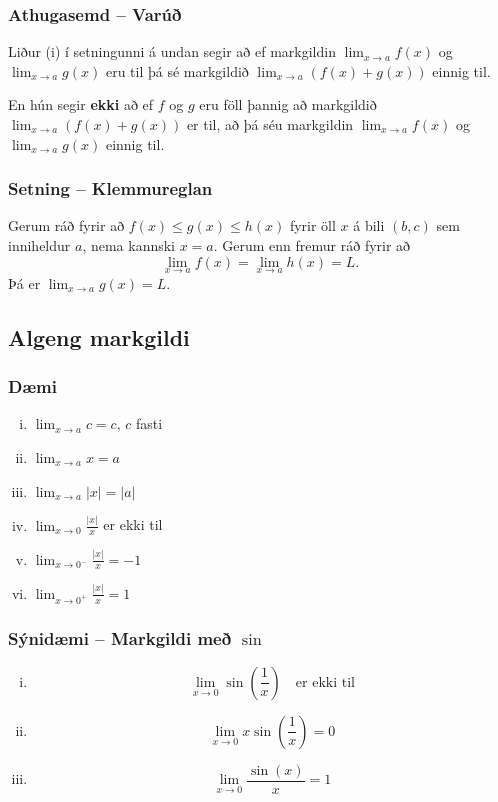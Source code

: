 \documentclass[icelandic,a4paper,12pt]{article}
\begin{document}
\subsubsection{Athugasemd -- Varúð}
Liður (i) í setningunni á undan segir að ef markgildin
$\lim_{x\to a} f(x)$ og $\lim_{x\to a} g(x)$ eru til þá
sé markgildið $\lim_{x\to a} (f(x)+g(x))$ einnig til.

\pause
En hún segir {\bf ekki} að ef 
$f$ og $g$ eru föll þannig að markgildið
$\lim_{x\to a} (f(x)+g(x))$ er til, að þá séu markgildin
$\lim_{x\to a} f(x)$ og $\lim_{x\to a} g(x)$ einnig til.

\subsubsection{Setning -- Klemmureglan}Gerum ráð fyrir að $f(x)\leq
g(x)\leq h(x)$ fyrir öll $x$ á bili $(b, c)$ sem
inniheldur $a$, nema kannski $x=a$.  Gerum enn fremur ráð fyrir að 
$$\lim_{x\rightarrow a}f(x)=\lim_{x\rightarrow a}h(x)=L.$$
Þá er $\lim_{x\rightarrow a}g(x)=L$.


\subsection{Algeng markgildi}
\subsubsection{Dæmi}
\begin{enumerate}[(i)] 
  \item $\lim_{x \to a} c = c$, $c$ fasti
\pause
  \item $\lim_{x \to a} x = a$
  \item $\lim_{x \to a} |x| = |a|$
\pause
  \item $\lim_{x \to 0} \frac{|x|}{x}$ er ekki til
\pause
  \item $\lim_{x \to 0^-} \frac{|x|}{x} = -1$
  \item $\lim_{x \to 0^+} \frac{|x|}{x} = 1$
\end{enumerate}

\subsubsection{Sýnidæmi -- Markgildi með $\sin$}
\begin{enumerate}[(i)] 
  \item $$\lim_{x\to 0} \sin\left(\frac 1x\right) \quad \text{er ekki til}$$
  \pause
  \item $$\lim_{x\to 0} x\sin\left(\frac 1x\right) = 0$$
  \pause
  \item $$\lim_{x \to 0} \frac{\sin(x)}{x} = 1$$
\end{enumerate}
\end{document}
